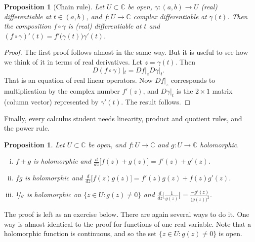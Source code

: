 \documentclass[12pt,openany]{book}
\newcommand{\C}{{\mathbb{C}}}
\theoremstyle{plain}
\newtheorem{prop}[thm]{Proposition}
\theoremstyle{remark}
\theoremstyle{definition}
\theoremstyle{exercise}
\theoremstyle{example}
\begin{document}
\begin{prop}[Chain rule]
%
\label{prop:chainrule2}%
Let $U \subset \C$ be open,
$\gamma \colon (a,b) \to U$ (real) differentiable at $t \in (a,b)$,
and $f \colon U \to \C$ complex differentiable at $\gamma(t)$.
Then the composition $f \circ \gamma$ is (real) differentiable
at $t$ and $(f \circ \gamma)'(t) = f'\bigl(\gamma(t)\bigr) \gamma'(t)$.
\end{prop}

\begin{proof}
The first proof follows almost in the same way.  But it is useful to see
how we think of it in terms of real derivatives.
Let $z = \gamma(t)$.  Then 
\begin{equation*}
D(f \circ \gamma)|_{t} =
Df|_z D\gamma|_{t} .
\end{equation*}
That is an equation of real linear operators.  Now $Df|_z$ corresponds
to multiplication by the complex number $f'(z)$, and $D\gamma|_{t}$
is the $2 \times 1$ matrix (column vector) represented by $\gamma'(t)$.
The result follows.
\end{proof}

Finally, every calculus student needs linearity, product and quotient rules,
and the power rule.

\begin{prop} \label{prop:sumproddiv}
Let $U \subset \C$ be open, and $f \colon U \to \C$ and
$g \colon U \to \C$ holomorphic.
\begin{enumerate}[(i)]
\item
$f+g$ is holomorphic and $\frac{d}{dz}\bigl[ f(z)+g(z) \bigr] = f'(z) + g'(z)$.
\item
$fg$ is holomorphic and $\frac{d}{dz}\bigl[f(z) g(z) \bigr] = f'(z)g(z) + f(z)g'(z)$.
\item
$\nicefrac{1}{g}$ is holomorphic on $\bigl\{ z \in U : g(z) \not= 0 \bigr\}$ and
$\frac{d}{dz}\bigl[\frac{1}{g(z)}\bigr] = \frac{-g'(z)}{{\bigl(g(z)\bigr)}^2}$.
\end{enumerate}
\end{prop}

The proof is left as an exercise below.  There are again several ways
to do it.  One way is almost identical to the
proof for functions of one real variable.
Note that
a holomorphic function is continuous, and so the set
$\bigl\{ z \in U : g(z) \not= 0 \bigr\}$ is open.
\end{document}
